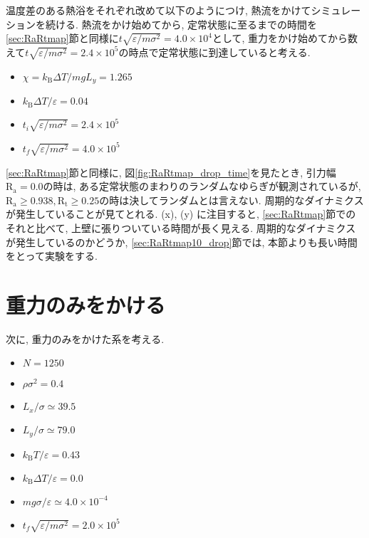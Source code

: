 温度差のある熱浴をそれぞれ改めて以下のようにつけ, 熱流をかけてシミュレーションを続ける. 熱流をかけ始めてから, 定常状態に至るまでの時間を\ref{sec:RaRtmap}節と同様に$t \sqrt{\varepsilon / m \sigma^2} = 4.0 \times 10^{4}$として, 重力をかけ始めてから数えて$t \sqrt{\varepsilon / m \sigma^2} = 2.4 \times 10^{5}$の時点で定常状態に到達していると考える. 

\begin{itemize}
  \item $\chi = k_{\text{B}}\Delta T / mg L_y = 1.265$
  \item $k_{\text{B}} \Delta T/\varepsilon = 0.04$
  \item $t_i \sqrt{\varepsilon / m \sigma^2} = 2.4 \times 10^{5}$
  \item $t_f \sqrt{\varepsilon / m \sigma^2} = 4.0 \times 10^{5}$
\end{itemize}



\ref{sec:RaRtmap}節と同様に, 図\ref{fig:RaRtmap_drop_time}を見たとき, 引力幅$\text{R}_\text{a}=0.0$の時は, ある定常状態のまわりのランダムなゆらぎが観測されているが, $\text{R}_\text{a} \ge 0.938, \text{R}_\text{t} \ge 0.25$の時は決してランダムとは言えない. 周期的なダイナミクスが発生していることが見てとれる. (x), (y) に注目すると, \ref{sec:RaRtmap}節でのそれと比べて, 上壁に張りついている時間が長く見える. 周期的なダイナミクスが発生しているのかどうか, \ref{sec:RaRtmap10_drop}節では, 本節よりも長い時間をとって実験をする. 

\section{重力のみをかける}\label{sec:dT0}

次に, 重力のみをかけた系を考える. 

\begin{itemize}
  \item $N = 1250$
  \item $\rho {\sigma}^2 = 0.4$
  \item $L_x / \sigma \simeq 39.5$
  \item $L_y / \sigma \simeq 79.0$
  \item $k_{\text{B}} T / \varepsilon = 0.43$
  \item $k_{\text{B}} \Delta T / \varepsilon = 0.0$
  \item $mg\sigma/\varepsilon \simeq 4.0 \times 10^{-4}$
  \item $t_f \sqrt{\varepsilon / m \sigma^2} = 2.0 \times 10^{5}$
\end{itemize}

